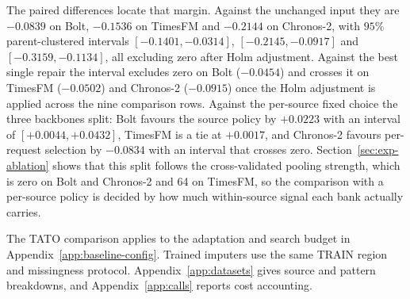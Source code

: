 \documentclass{article}
\begin{document}
The paired differences locate that margin. Against the unchanged input they are $-0.0839$ on
Bolt, $-0.1536$ on TimesFM and $-0.2144$ on Chronos-2, with $95\%$ parent-clustered intervals
$[-0.1401,-0.0314]$, $[-0.2145,-0.0917]$ and $[-0.3159,-0.1134]$, all excluding zero after
Holm adjustment. Against the best single repair the interval excludes zero on Bolt
($-0.0454$) and crosses it on TimesFM ($-0.0502$) and Chronos-2 ($-0.0915$) once the Holm
adjustment is applied across the nine comparison rows. Against the per-source fixed choice the
three backbones split: Bolt favours the source policy by $+0.0223$ with an interval of
$[+0.0044,+0.0432]$, TimesFM is a tie at $+0.0017$, and Chronos-2 favours per-request
selection by $-0.0834$ with an interval that crosses zero. Section~\ref{sec:exp-ablation}
shows that this split follows the cross-validated pooling strength, which is zero on Bolt and
Chronos-2 and 64 on TimesFM, so the comparison with a per-source policy is decided by how much
within-source signal each bank actually carries.

The TATO comparison applies to the adaptation and search budget in Appendix~\ref{app:baseline-config}.
Trained imputers use the same TRAIN region and missingness protocol. Appendix~\ref{app:datasets}
gives source and pattern breakdowns, and Appendix~\ref{app:calls} reports cost accounting.
\end{document}
